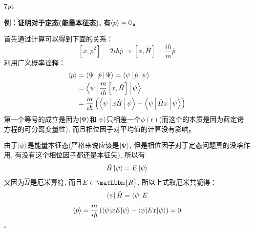 \documentclass[a4paper,zihao=-4,linespread=1]{ctexrep}
\newenvironment{thinknote}{%
\def\FrameCommand{%
\hspace{1pt}%
{\color{BurlyWood}\vrule width 2pt}%
{\color{formalshade}\vrule width 4pt}%
\colorbox{formalshade}%
}%
\MakeFramed{\advance\hsize-\width\FrameRestore}%
\noindent\hspace{-4.55pt}%
\begin{adjustwidth}{}{7pt}%
\vspace{2pt}\vspace{2pt}%
}
{%
\vspace{2pt}\end{adjustwidth}\endMakeFramed%
}
\begin{document}
    \begin{thinknote}
        \textbf{例：证明对于定态(能量本征态), 有$\braket{p}=0$。}


        \setlength\parindent{2em}首先通过计算可以得到下面的关系：
        \[\left[x,\hat{p}^2\right]=2i\hbar\hat p\Rightarrow\left[x,\hat H\right]=\frac{i\hbar}{m}\hat p\]
        利用广义概率诠释：
        \begin{align*}
            \braket{p}&=\Braket{\Psi|\hat p|\Psi}=\Braket{\psi|\hat p|\psi}\\
            &=\Braket{\psi|\frac{m}{i\hbar}\left[x,\hat H\right]|\psi}\\
            &=\frac{m}{i\hbar}\left(\Braket{\psi|x\hat H|\psi}-\Braket{\psi|\hat H x|\psi}\right)
        \end{align*}
        第一个等号的成立是因为$\ket{\Psi}$和$\ket{\psi}$只相差一个$\phi(t)$(而这个的本质是因为薛定谔方程的可分离变量性), 而且相位因子对平均值的计算没有影响。
        
        \setlength\parindent{2em}由于$\ket{\psi}$是能量本征态(严格来说应该是$\ket{\Psi}$, 但是相位因子对于定态问题真的没啥作用, 有没有这个相位因子都还是本征矢), 所以有:
        \[\hat H\ket{\psi}=E\ket{\psi}\]
        又因为$\hat H$是厄米算符, 而且$E\in\mathbbm{R}$, 所以上式取厄米共轭得：
        \[\bra{\psi}\hat H=\bra{\psi}E\]
        \begin{equation*}
            \braket{p}=\frac{m}{i\hbar}\left(\braket{\psi|xE|\psi}-\braket{\psi|Ex|\psi}\right)=0
        \end{equation*}
        \hfill $\square$\par
    \end{thinknote}
\end{document}
